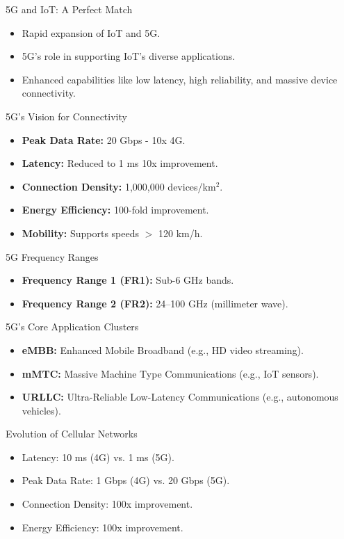 \documentclass{beamer}
\begin{document}
\begin{frame}{5G and IoT: A Perfect Match}
  \begin{itemize}
      \item Rapid expansion of IoT and 5G.
      \item 5G's role in supporting IoT's diverse applications.
      \item Enhanced capabilities like low latency, high reliability, and massive device connectivity.
  \end{itemize}
\end{frame}

\begin{frame}{5G's Vision for Connectivity}
  \begin{itemize}
      \item \textbf{Peak Data Rate:} 20 Gbps - 10x 4G.
      \item \textbf{Latency:} Reduced to 1 ms 10x improvement.
      \item \textbf{Connection Density:} 1,000,000 devices/km$^2$.
      \item \textbf{Energy Efficiency:} 100-fold improvement.
      \item \textbf{Mobility:} Supports speeds $>$ 120 km/h.
  \end{itemize}
\end{frame}

\begin{frame}{5G Frequency Ranges}
  \begin{itemize}
      \item \textbf{Frequency Range 1 (FR1):} Sub-6 GHz bands.
      \item \textbf{Frequency Range 2 (FR2):} 24–100 GHz (millimeter wave).
  \end{itemize}
\end{frame}

\begin{frame}{5G's Core Application Clusters}
  \begin{itemize}
      \item \textbf{eMBB:} Enhanced Mobile Broadband (e.g., HD video streaming).
      \item \textbf{mMTC:} Massive Machine Type Communications (e.g., IoT sensors).
      \item \textbf{URLLC:} Ultra-Reliable Low-Latency Communications (e.g., autonomous vehicles).
  \end{itemize}
\end{frame}

\begin{frame}{Evolution of Cellular Networks}
  \begin{itemize}
      \item Latency: 10 ms (4G) vs. 1 ms (5G).
      \item Peak Data Rate: 1 Gbps (4G) vs. 20 Gbps (5G).
      \item Connection Density: 100x improvement.
      \item Energy Efficiency: 100x improvement.
  \end{itemize}
\end{frame}
\end{document}
